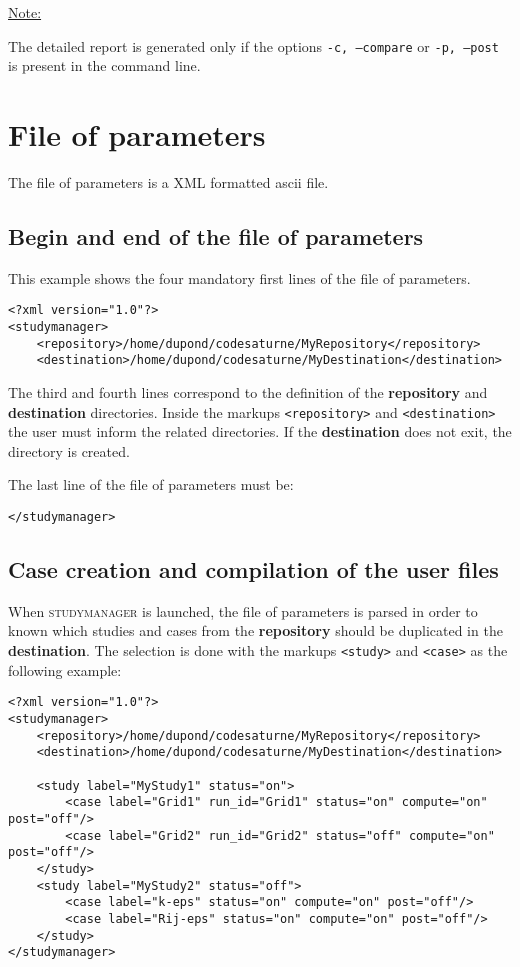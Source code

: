 \documentclass[a4paper,10pt,twoside]{csshortdoc}
\begin{document}
\underline{Note:}

The detailed report is generated only if the options \texttt{-c, --compare}
or \texttt{-p, --post} is present in the command line.

\section{File of parameters}

The file of parameters is a XML formatted ascii file.

\subsection{Begin and end of the file of parameters}

This example shows the four mandatory first lines of the file of parameters.

\small
\begin{verbatim}
<?xml version="1.0"?>
<studymanager>
    <repository>/home/dupond/codesaturne/MyRepository</repository>
    <destination>/home/dupond/codesaturne/MyDestination</destination>
\end{verbatim}
\normalsize

The third and fourth lines correspond to the definition of the
\textbf{repository} and \textbf{destination} directories.
Inside the markups \texttt{<repository>} and \texttt{<destination>} the user
must inform the related directories. If the \textbf{destination} does not exit,
the directory is created.

The last line of the file of parameters must be:

\small
\begin{verbatim}
</studymanager>
\end{verbatim}
\normalsize

\subsection{Case creation and compilation of the user files}

When \textsc{studymanager} is launched, the file of parameters is parsed in order to
known which studies and cases from the \textbf{repository} should be duplicated
in the \textbf{destination}. The selection is done with the markups
\texttt{<study>} and \texttt{<case>} as the following example:

\small
\begin{verbatim}
<?xml version="1.0"?>
<studymanager>
    <repository>/home/dupond/codesaturne/MyRepository</repository>
    <destination>/home/dupond/codesaturne/MyDestination</destination>

    <study label="MyStudy1" status="on">
        <case label="Grid1" run_id="Grid1" status="on" compute="on" post="off"/>
        <case label="Grid2" run_id="Grid2" status="off" compute="on" post="off"/>
    </study>
    <study label="MyStudy2" status="off">
        <case label="k-eps" status="on" compute="on" post="off"/>
        <case label="Rij-eps" status="on" compute="on" post="off"/>
    </study>
</studymanager>
\end{verbatim}
\normalsize
\end{document}
